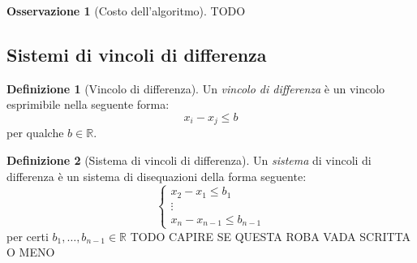 \documentclass[14pt]{extreport}
\theoremstyle{definition}
\newtheorem{definition}{Definizione}[subsection]
\theoremstyle{definition}
\newtheorem{remark}{Osservazione}[subsection]
\begin{document}
\begin{remark}[Costo dell'algoritmo]
    TODO
\end{remark}

\subsection{Sistemi di vincoli di differenza}

\begin{definition}[Vincolo di differenza]
    Un \textit{vincolo di differenza} è un vincolo esprimibile nella seguente forma: $$x_i - x_j \le b$$ per qualche $b \in \mathbb{R}$.
\end{definition}

\begin{definition}[Sistema di vincoli di differenza]
    Un \textit{sistema} di vincoli di differenza è un sistema di disequazioni della forma seguente: $$\left\{\begin{array}{c} x_2 - x_1 \le b_1 \\ \vdots \\ x_n - x_{n - 1} \le b_{n - 1}\end{array}\right.$$ per certi $b_1, \ldots, b_{n - 1} \in \mathbb{R}$ TODO CAPIRE SE QUESTA ROBA VADA SCRITTA O MENO
\end{definition}
\end{document}

